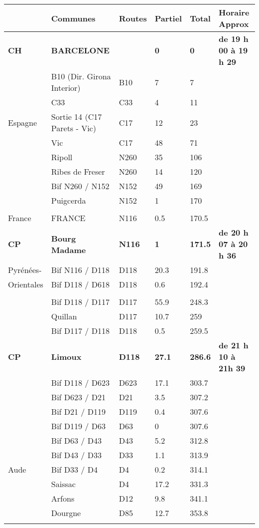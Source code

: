 \documentclass{article}%
\begin{document}
\begin{longtable}{p{2.25cm}|p{7.0cm}|p{1.5cm}|p{1.5cm}|p{1.5cm}|p{3.5cm}}%
\hline%
&Communes&Routes&Partiel&Total&Horaire Approx\\%
\hline%
\endhead%
\endfoot%
\endlastfoot%
\textbf{﻿CH}&\textbf{BARCELONE}& &\textbf{0}&\textbf{0}&\textbf{de 19 h 00 à 19 h 29}\\%
 &B10 (Dir. Girona Interior)&B10&7&7& \\%
 &C33&C33&4&11& \\%
Espagne&Sortie 14 (C17 Parets - Vic)&C17&12&23& \\%
 &Vic&C17 &48&71& \\%
 &Ripoll&N260&35&106& \\%
 &Ribes de Freser&N260&14&120& \\%
 &Bif N260 / N152&N152&49&169& \\%
 &Puigcerda&N152&1&170& \\%
\hline& & & & & \\%
France&FRANCE &N116&0.5&170.5& \\%
\textbf{CP}&\textbf{Bourg Madame}&\textbf{N116}&\textbf{1}&\textbf{171.5}&\textbf{de 20 h 07 à 20 h 36}\\%
Pyrénées-&Bif N116 / D118&D118&20.3&191.8& \\%
Orientales&Bif D118 / D618&D118&0.6&192.4& \\%
\hline& & & & & \\%
 &Bif D118 / D117&D117&55.9&248.3& \\%
 &Quillan&D117&10.7&259& \\%
 &Bif D117 / D118&D118&0.5&259.5& \\%
\textbf{CP}&\textbf{Limoux }&\textbf{D118}&\textbf{27.1}&\textbf{286.6}&\textbf{de 21 h 10 à 21h 39}\\%
 &Bif D118 / D623&D623&17.1&303.7& \\%
 &Bif D623 / D21&D21&3.5&307.2& \\%
 &Bif D21 / D119 &D119&0.4&307.6& \\%
 &Bif D119 / D63&D63&0&307.6& \\%
 &Bif D63 / D43&D43&5.2&312.8& \\%
 &Bif D43 / D33&D33&1.1&313.9& \\%
Aude &Bif D33 / D4&D4&0.2&314.1& \\%
 &Saissac&D4 &17.2&331.3& \\%
 &Arfons&D12&9.8&341.1& \\%
 &Dourgne&D85&12.7&353.8& \\%
\hline& & & & & \\%

\end{longtable}
\end{document}
